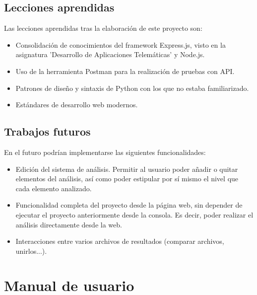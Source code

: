 \documentclass[a4paper, 12pt]{book}
\begin{document}
\section{Lecciones aprendidas}
\label{sec:lecciones_aprendidas}

Las lecciones aprendidas tras la elaboración de este proyecto son:

\begin{itemize}
    \item Consolidación de conocimientos del framework Express.js, visto en la asignatura 'Desarrollo de Aplicaciones Telemáticas' y Node.js.
    \item Uso de la herramienta Postman para la realización de pruebas con API.
    \item Patrones de diseño y sintaxis de Python con los que no estaba familiarizado.
    \item Estándares de desarrollo web modernos.
\end{itemize}

\section{Trabajos futuros}
\label{sec:trabajos_futuros}

En el futuro podrían implementarse las siguientes funcionalidades:

\begin{itemize}
    \item Edición del sistema de análisis. Permitir al usuario poder añadir o quitar elementos del análisis, así como poder estipular por sí mismo el nivel que cada elemento analizado.
    \item Funcionalidad completa del proyecto desde la página web, sin depender de ejecutar el proyecto anteriormente desde la consola. Es decir, poder realizar el análisis directamente desde la web.
    \item Interacciones entre varios archivos de resultados (comparar archivos, unirlos...). 
\end{itemize}



\cleardoublepage
\appendix
\chapter{Manual de usuario}
\label{app:manual}
\end{document}

